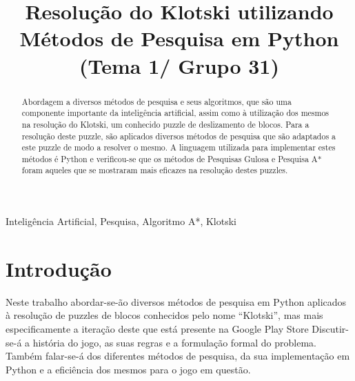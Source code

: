 \documentclass[conference]{IEEEtran}
\begin{document}
\title{Resolução do Klotski utilizando Métodos de Pesquisa em Python (Tema 1/ Grupo 31)}

\author{
\and
{}
\and
{}
}

\maketitle

\begin{abstract}
Abordagem a diversos métodos de pesquisa e seus algoritmos, que são uma componente importante da inteligência artificial, assim como à utilização dos mesmos na resolução do Klotski, um conhecido puzzle de deslizamento de blocos.
Para a resolução deste puzzle, são aplicados diversos métodos de pesquisa que são adaptados a este puzzle de modo a resolver o mesmo. A linguagem utilizada para implementar estes métodos é Python e verificou-se que os métodos de Pesquisas Gulosa e Pesquisa A* foram aqueles que se mostraram mais eficazes na resolução destes puzzles.
\end{abstract}

\begin{IEEEkeywords}
Inteligência Artificial, Pesquisa, Algoritmo A*, Klotski
\end{IEEEkeywords}

\section{Introdução}
Neste trabalho abordar-se-ão diversos métodos de pesquisa em Python aplicados à resolução de puzzles de blocos conhecidos pelo nome “Klotski”, mas mais especificamente a iteração deste que está presente na Google Play Store \cite{b1} Discutir-se-á a história do jogo, as suas regras e a formulação formal do problema. Também falar-se-á dos diferentes métodos de pesquisa, da sua implementação em Python e a eficiência dos mesmos para o jogo em questão. 
\end{document}
